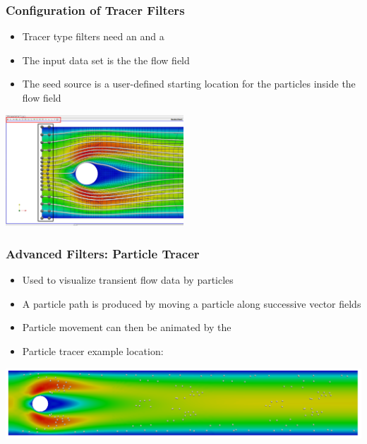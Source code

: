 \begin{frame}

  \frametitle{Configuration of Tracer Filters}

    \begin{itemize}
      \item Tracer type filters need an  and a 
      \item The input data set is the the flow field  
      \item The seed source is a user-defined starting location for the particles inside the flow field  
    \end{itemize}
		\begin{center}
    \includegraphics[width=0.5\textwidth]{screenshots/tracer-source.png}			
		\end{center}
\end{frame}

\begin{frame}

  \frametitle{Advanced Filters: Particle Tracer}

    \begin{itemize}
      \item Used to visualize transient flow data by particles 
      \item A particle path is produced by moving a particle along successive vector fields 
      \item Particle movement can then be animated by the  
      \item Particle tracer example location: 
    \end{itemize}
    \includegraphics[width=\textwidth]{screenshots/particle-tracer.png}

\end{frame}


